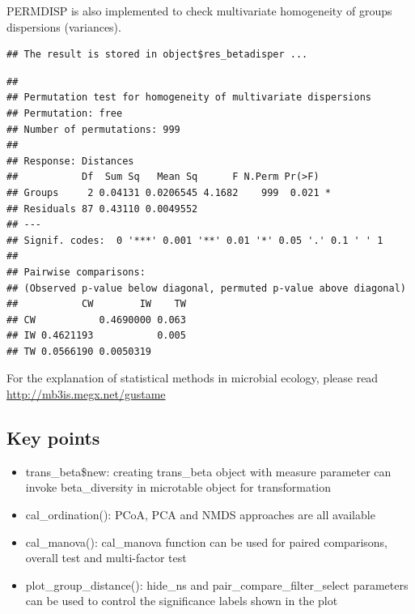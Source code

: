 \documentclass[
]{book}
\newenvironment{Shaded}{\begin{snugshade}}{\end{snugshade}}
\newcommand{\CommentTok}[1]{\textcolor[rgb]{0.56,0.35,0.01}{\textit{#1}}}
\newcommand{\FunctionTok}[1]{\textcolor[rgb]{0.00,0.00,0.00}{#1}}
\newcommand{\NormalTok}[1]{#1}
\newcommand{\SpecialCharTok}[1]{\textcolor[rgb]{0.00,0.00,0.00}{#1}}
\providecommand{\tightlist}{%
  \setlength{\itemsep}{0pt}\setlength{\parskip}{0pt}}
\begin{document}
PERMDISP\citep{Anderson_Navigating_2011} is also implemented to check multivariate homogeneity of groups dispersions (variances).

\begin{Shaded}
\end{Shaded}

\begin{verbatim}
## The result is stored in object$res_betadisper ...
\end{verbatim}

\begin{Shaded}
\end{Shaded}

\begin{verbatim}
## 
## Permutation test for homogeneity of multivariate dispersions
## Permutation: free
## Number of permutations: 999
## 
## Response: Distances
##           Df  Sum Sq   Mean Sq      F N.Perm Pr(>F)  
## Groups     2 0.04131 0.0206545 4.1682    999  0.021 *
## Residuals 87 0.43110 0.0049552                       
## ---
## Signif. codes:  0 '***' 0.001 '**' 0.01 '*' 0.05 '.' 0.1 ' ' 1
## 
## Pairwise comparisons:
## (Observed p-value below diagonal, permuted p-value above diagonal)
##           CW        IW    TW
## CW           0.4690000 0.063
## IW 0.4621193           0.005
## TW 0.0566190 0.0050319
\end{verbatim}

For the explanation of statistical methods in microbial ecology, please read \url{http://mb3is.megx.net/gustame}

\hypertarget{key-points-4}{%
\subsection{Key points}\label{key-points-4}}

\begin{itemize}
\tightlist
\item
  trans\_beta\$new: creating trans\_beta object with measure parameter can invoke beta\_diversity in microtable object for transformation
\item
  cal\_ordination(): PCoA, PCA and NMDS approaches are all available
\item
  cal\_manova(): cal\_manova function can be used for paired comparisons, overall test and multi-factor test
\item
  plot\_group\_distance(): hide\_ns and pair\_compare\_filter\_select parameters can be used to control the significance labels shown in the plot
\end{itemize}
\end{document}
